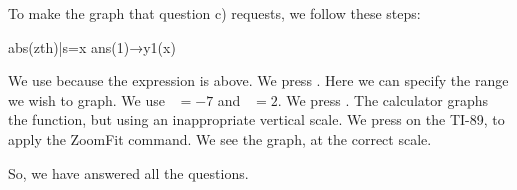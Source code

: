 To make the graph that question c) requests, we follow these steps:

\begin{entry}
abs(zth)|s=x
ans(1)→y1(x)
\end{entry}

We use  because the expression is above. We press
\key{$\diamond$} . Here we can specify the range we wish
to graph. We use ~$= -7$ and ~$= 2$. We press
\key{$\diamond$} . The calculator graphs the function,
but using an inappropriate vertical scale. We press  
on the TI-89, to apply the ZoomFit command. We see the graph, at the
correct scale.

So, we have answered all the questions.
